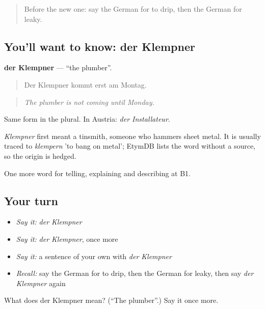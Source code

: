\label{lesson:GE-C428-klempner}



\begin{quote}
Before the new one: say the German for to drip, then the German for leaky.
\end{quote}

\subsection*{You'll want to know: der Klempner}
\textbf{der Klempner} — \textquotedblleft{}the plumber\textquotedblright{}.

\begin{quote}
Der Klempner kommt erst am Montag.
\end{quote}

\begin{quote}
\emph{The plumber is not coming until Monday.}
\end{quote}

Same form in the plural. In Austria: \emph{der Installateur}.

\begin{cousinweb}
\emph{Klempner} first meant a tinsmith, someone who hammers sheet metal. It is usually traced to \emph{klempern} 'to bang on metal'; EtymDB lists the word without a source, so the origin is hedged.
\end{cousinweb}

\begin{grammarlens}[title={What you've built}]
One more word for telling, explaining and describing at B1.
\end{grammarlens}

\subsection*{Your turn}
\begin{itemize}
\raggedright
  \item \emph{Say it:} \emph{der Klempner}
  \item \emph{Say it:} \emph{der Klempner}, once more
  \item \emph{Say it:} a sentence of your own with \emph{der Klempner}
  \item \emph{Recall:} say the German for to drip, then the German for leaky, then say \emph{der Klempner} again
\end{itemize}

\begin{tcolorbox}[breakable,colback=teal!4,colframe=teal!35!black,title={Before you move on}]
What does der Klempner mean? (\textquotedblleft{}The plumber\textquotedblright{}.) Say it once more.
\end{tcolorbox}
